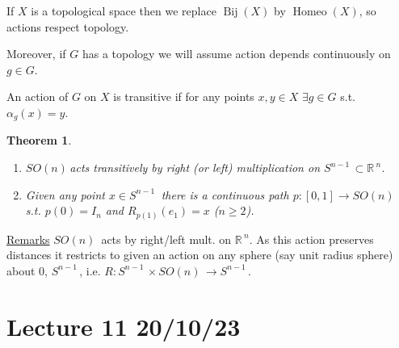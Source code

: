 \documentclass[12pt,a4paper]{article}
\newcommand{\rR}{\ensuremath{\mathbb{R}\,}}
\newcommand{\gson}{\ensuremath{SO(n)\,}}
\newcommand{\sph}[1]{\ensuremath{S^{#1}}\,}
\newcommand{\ul}[1]{\underline{#1}}
\newcommand{\bij}[1]{\ensuremath{\operatorname{Bij}(#1)}}
\newcommand{\homeo}[1]{\ensuremath{\operatorname{Homeo}(#1)}}
\newtheorem{thm}{Theorem}[subsubsection]
\begin{document}
If $X$ is a topological space then we replace $\bij{X}$ by $\homeo{X}$, so actions respect topology. 

Moreover, if $G$ has a topology we will assume action depends continuously on $g\in G$.

An action of $G$ on $X$ is transitive if for any points $x,y\in X$ $\exists g\in G$ s.t. $\alpha_g(x)=y$.

\begin{thm}
\label{transitive_action_on_sphere}
\hfill
\begin{enumerate}
\item \gson acts transitively by right (or left) multiplication on $\sph{n-1}\subset \rR^n$. \item Given any point $x\in \sph{n-1}$ there is a continuous path $p:[0,1]\to\gson$ s.t. $p(0)=I_n$ and $R_{p(1)}(e_1)=x$ ($n\geq 2$).
\end{enumerate}
\end{thm}

\ul{Remarks} $\gson$ acts by right/left mult. on $\rR^n$. As this action preserves distances it restricts to given an action on any sphere (say unit radius sphere) about $0$, $\sph{n-1}$, i.e. $R:\sph{n-1}\times \gson \to \sph{n-1}$.

\section{Lecture 11 20/10/23}
\end{document}
